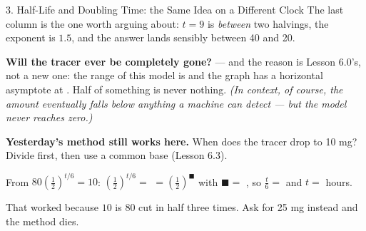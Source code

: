 \documentclass[10pt]{article}
\begin{document}
\begin{notesbox}{3. Half-Life and Doubling Time: the Same Idea on a Different Clock}
\vspace{2pt}
The last column is the one worth arguing about: $t=9$ is \emph{between} two halvings, the exponent is
$1.5$, and the answer lands sensibly between 40 and 20.

\vspace{3pt}
\textbf{Will the tracer ever be completely gone?} \blank{2.0cm} --- and the reason is Lesson 6.0's, not
a new one: the range of this model is \blank{2.2cm} and the graph has a horizontal asymptote at
\blank{1.6cm}. Half of something is never nothing. \emph{(In context, of course, the amount eventually
falls below anything a machine can detect --- but the model never reaches zero.)}

\vspace{4pt}
\begin{tcolorbox}[colback=greenbg, colframe=greenacc, boxrule=0.8pt, arc=1.5mm,
    left=2.5mm, right=2.5mm, top=1.5mm, bottom=1.5mm]
\textbf{Yesterday's method still works here.} When does the tracer drop to 10 mg? Divide first, then
use a common base (Lesson 6.3).

\vspace{3pt}
\hspace*{1.0em} From $80\left(\frac12\right)^{t/6}=10$: \quad
$\left(\frac12\right)^{t/6}=$ \blank{1.2cm} $=\left(\frac12\right)^{\blacksquare}$ with
$\blacksquare=$ \blank{0.9cm}, \quad so $\frac{t}{6}=$ \blank{0.9cm} \; and \; $t=$ \blank{1.4cm} hours.

\vspace{3pt}
That worked because $10$ is $80$ cut in half three times. Ask for 25 mg instead and the method dies.
\end{tcolorbox}
\end{notesbox}
\end{document}
